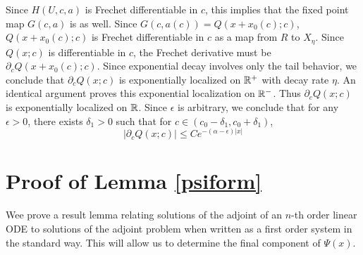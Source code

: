\documentclass[thesis.tex]{subfiles}
\begin{document}
Since $H(U, c, a)$ is Frechet differentiable in $c$, this implies that the fixed point map $G(c, a)$ is as well. Since $G(c, a(c)) = Q(x + x_0(c); c)$, $Q(x + x_0(c); c)$ is Frechet differentiable in $c$ as a map from $R$ to $X_\eta$. Since $Q(x; c)$ is differentiable in $c$, the Frechet derivative must be $\partial_c Q(x + x_0(c); c)$. Since exponential decay involves only the tail behavior, we conclude that $\partial_c Q(x; c)$ is exponentially localized on $\mathbb{R}^+$ with decay rate $\eta$. An identical argument proves this exponential localization on $\mathbb{R}^-$. Thus $\partial_c Q(x; c)$ is exponentially localized on $\mathbb{R}$. Since $\epsilon$ is arbitrary, we conclude that for any $\epsilon > 0$, there exists $\delta_1 > 0$ such that for $c \in (c_0 - \delta_1, c_0 + \delta_1)$,
\[
|\partial_c Q(x; c)| \leq C e^{-(\alpha - \epsilon)|x|}
\] 

\section{Proof of Lemma \ref{psiform}}

Wee prove a result lemma relating solutions of the adjoint of an $n$-th order linear ODE to solutions of the adjoint problem when written as a first order system in the standard way. This will allow us to determine the final component of $\Psi(x)$.
\end{document}
